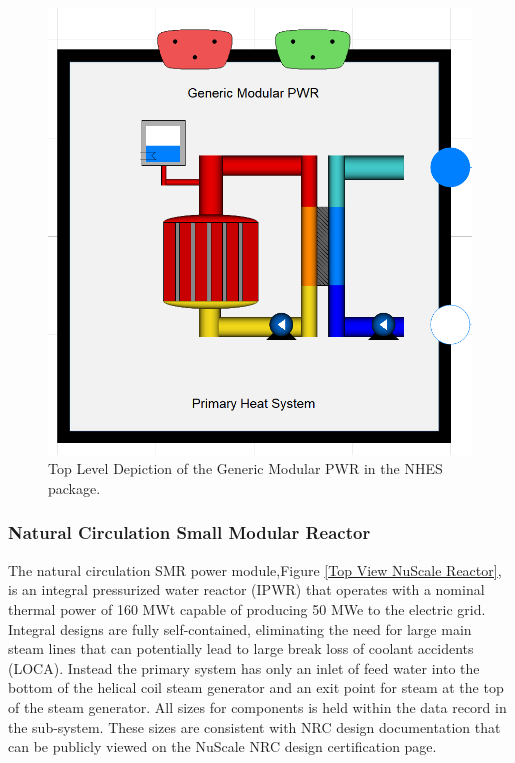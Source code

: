 \begin{figure}[hbtp]
\centering
\includegraphics[scale=0.3]{pics/Generic_Modular_PWR.png}
\caption{Top Level Depiction of the Generic Modular PWR in the NHES package.}
\label{Top View Generic Modular}
\end{figure}

\subsubsection{Natural Circulation Small Modular Reactor}
The natural circulation SMR power module,Figure \ref{Top View NuScale Reactor}, is an integral pressurized water reactor (IPWR) that operates with a nominal thermal power of 160 MWt capable of producing 50 MWe to the electric grid. Integral designs are fully self-contained, eliminating the need for large main steam lines that can potentially lead to large break loss of coolant accidents (LOCA). Instead the primary system has only an inlet of feed water into the bottom of the helical coil steam generator and an exit point for steam at the top of the steam generator. All sizes for components is held within the data record in the sub-system. These sizes are consistent with NRC design documentation that can be publicly viewed on the NuScale NRC design certification page. 

